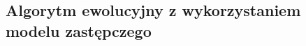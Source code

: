 \documentclass[runningheads]{llncs}
\begin{document}

\newpage
\subsection{Algorytm ewolucyjny z wykorzystaniem modelu zastępczego}
\end{document}
